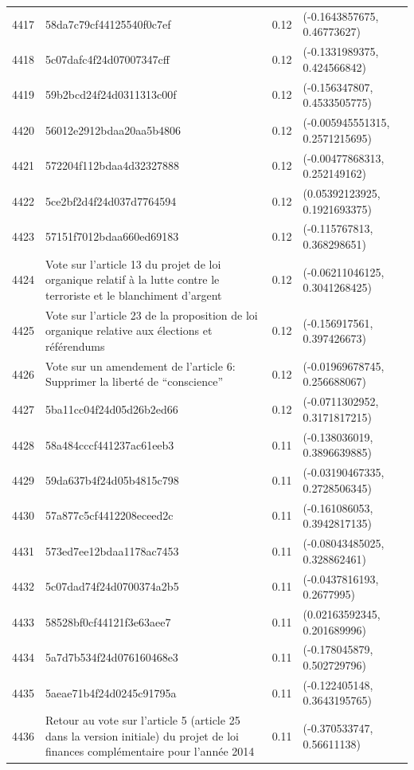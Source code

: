 \begin{table}[ht]
\begin{tabular}{rlrl}
  4417 & 58da7c79cf44125540f0c7ef & 0.12 & (-0.1643857675, 0.46773627) \\ 
  4418 & 5c07dafc4f24d07007347cff & 0.12 & (-0.1331989375, 0.424566842) \\ 
  4419 & 59b2bcd24f24d0311313c00f & 0.12 & (-0.156347807, 0.4533505775) \\ 
  4420 & 56012e2912bdaa20aa5b4806 & 0.12 & (-0.005945551315, 0.2571215695) \\ 
  4421 & 572204f112bdaa4d32327888 & 0.12 & (-0.00477868313, 0.252149162) \\ 
  4422 & 5ce2bf2d4f24d037d7764594 & 0.12 & (0.05392123925, 0.1921693375) \\ 
  4423 & 57151f7012bdaa660ed69183 & 0.12 & (-0.115767813, 0.368298651) \\ 
  4424 & Vote sur l'article 13 du projet de loi organique relatif à la lutte contre le terroriste et le blanchiment d'argent & 0.12 & (-0.06211046125, 0.3041268425) \\ 
  4425 & Vote sur l'article 23 de la proposition de loi organique relative aux élections et référendums & 0.12 & (-0.156917561, 0.397426673) \\ 
  4426 & Vote sur un amendement de l'article 6: Supprimer la liberté de “conscience” & 0.12 & (-0.01969678745, 0.256688067) \\ 
  4427 & 5ba11cc04f24d05d26b2ed66 & 0.12 & (-0.0711302952, 0.3171817215) \\ 
  4428 & 58a484cccf441237ac61eeb3 & 0.11 & (-0.138036019, 0.3896639885) \\ 
  4429 & 59da637b4f24d05b4815c798 & 0.11 & (-0.03190467335, 0.2728506345) \\ 
  4430 & 57a877c5cf4412208eceed2c & 0.11 & (-0.161086053, 0.3942817135) \\ 
  4431 & 573ed7ee12bdaa1178ac7453 & 0.11 & (-0.08043485025, 0.328862461) \\ 
  4432 & 5c07dad74f24d0700374a2b5 & 0.11 & (-0.0437816193, 0.2677995) \\ 
  4433 & 58528bf0cf44121f3e63aee7 & 0.11 & (0.02163592345, 0.201689996) \\ 
  4434 & 5a7d7b534f24d076160468e3 & 0.11 & (-0.178045879, 0.502729796) \\ 
  4435 & 5aeae71b4f24d0245c91795a & 0.11 & (-0.122405148, 0.3643195765) \\ 
  4436 & Retour au vote sur l'article 5 (article 25 dans la version initiale) du projet de loi finances complémentaire pour l'année 2014 & 0.11 & (-0.370533747, 0.56611138) \\ 

\end{tabular}
\end{table}
